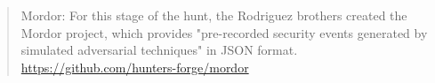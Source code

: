 \documentclass[Screen16to9,17pt]{foils}
\begin{document}


\begin{quote}
Mordor: For this stage of the hunt, the Rodriguez brothers created the Mordor
project, which provides
"pre-recorded security events generated by simulated adversarial techniques" in
JSON format.\\
 \url{https://github.com/hunters-forge/mordor}
\end{quote}



\slidenext{}
\end{document}
